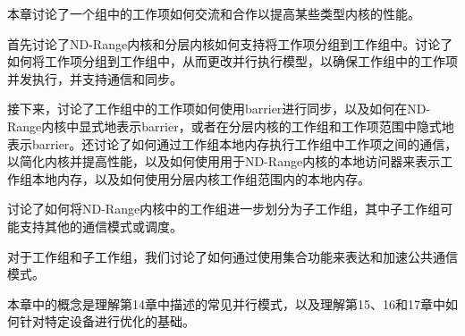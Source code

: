 本章讨论了一个组中的工作项如何交流和合作以提高某些类型内核的性能。\par

首先讨论了ND-Range内核和分层内核如何支持将工作项分组到工作组中。讨论了如何将工作项分组到工作组中，从而更改并行执行模型，以确保工作组中的工作项并发执行，并支持通信和同步。\par

接下来，讨论了工作组中的工作项如何使用barrier进行同步，以及如何在ND-Range内核中显式地表示barrier，或者在分层内核的工作组和工作项范围中隐式地表示barrier。还讨论了如何通过工作组本地内存执行工作组中工作项之间的通信，以简化内核并提高性能，以及如何使用用于ND-Range内核的本地访问器来表示工作组本地内存，以及如何使用分层内核工作组范围内的本地内存。\par

讨论了如何将ND-Range内核中的工作组进一步划分为子工作组，其中子工作组可能支持其他的通信模式或调度。\par

对于工作组和子工作组，我们讨论了如何通过使用集合功能来表达和加速公共通信模式。\par

本章中的概念是理解第14章中描述的常见并行模式，以及理解第15、16和17章中如何针对特定设备进行优化的基础。\par


\newpage